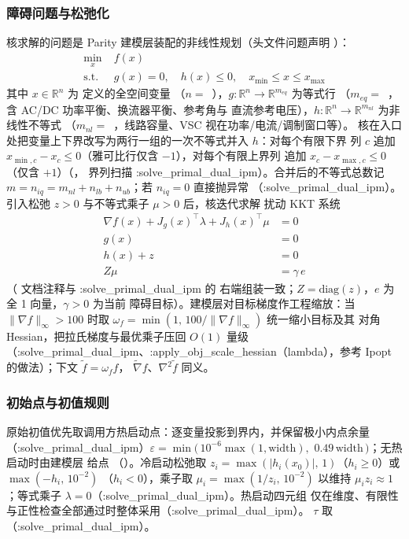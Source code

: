 \subsubsection*{障碍问题与松弛化}
核求解的问题是 Parity 建模层装配的非线性规划（头文件问题声明
）：
\begin{align*}
\min_{x}\; & f(x)\\
\text{s.t.}\; & g(x) = 0,\quad h(x) \le 0,\quad x_{\min} \le x \le x_{\max}
\end{align*}
其中 $x\in\mathbb{R}^{n}$ 为  定义的全空间变量
（$n=$~），$g:\mathbb{R}^n\to\mathbb{R}^{m_{eq}}$ 为等式行
（$m_{eq}=$~，含 AC/DC 功率平衡、换流器平衡、参考角与
直流参考电压），$h:\mathbb{R}^n\to\mathbb{R}^{m_{nl}}$ 为非线性不等式
（$m_{nl}=$~，线路容量、VSC 视在功率/电流/调制窗口等）。
核在入口处把变量上下界改写为两行一组的一次不等式并入 $h$：对每个有限下界
列 $c$ 追加 $x_{\min,c}-x_c\le 0$（雅可比行仅含 $-1$），对每个有限上界列
追加 $x_c-x_{\max,c}\le 0$（仅含 $+1$）（，
界列扫描 :solve\_primal\_dual\_ipm）。合并后的不等式总数记
$m=n_{iq}=m_{nl}+n_{lb}+n_{ub}$；若 $n_{iq}=0$ 直接抛异常
（:solve\_primal\_dual\_ipm）。引入松弛 $z>0$ 与不等式乘子 $\mu>0$ 后，核迭代求解
扰动 KKT 系统
\begin{align*}
\nabla f(x) + J_g(x)^{\top}\lambda + J_h(x)^{\top}\mu &= 0\\
g(x) &= 0\\
h(x) + z &= 0\\
Z\mu &= \gamma\, e
\end{align*}
（ 文档注释与 :solve\_primal\_dual\_ipm 的
右端组装一致；$Z=\mathrm{diag}(z)$，$e$ 为全 1 向量，$\gamma>0$ 为当前
障碍目标）。建模层对目标梯度作工程缩放：当
$\lVert\nabla f\rVert_\infty>100$ 时取
$\omega_f=\min(1,\,100/\lVert\nabla f\rVert_\infty)$ 统一缩小目标及其
对角 Hessian，把拉氏梯度与最优乘子压回 $O(1)$ 量级（:solve\_primal\_dual\_ipm、:apply\_obj\_scale\_hessian（lambda），参考
Ipopt  的做法）；下文 $\tilde f=\omega_f f$，
$\tilde\nabla f$、$\nabla^2\tilde f$ 同义。

\subsubsection*{初始点与初值规则}
原始初值优先取调用方热启动点：逐变量投影到界内，并保留极小内点余量
（:solve\_primal\_dual\_ipm）$\varepsilon=\min(\,10^{-6}\max(1,\mathrm{width}),$
$0.49\,\mathrm{width}\,)$；无热启动时由建模层 
给点
（）。冷启动松弛取
$z_i=\max(|h_i(x_0)|,\,1)$（$h_i\ge0$）或 $\max(-h_i,\,10^{-2})$
（$h_i<0$），乘子取 $\mu_i=\max(1/z_i,\,10^{-2})$ 以维持
$\mu_i z_i\approx1$；等式乘子 $\lambda=0$（:solve\_primal\_dual\_ipm）。热启动四元组
仅在维度、有限性与正性检查全部通过时整体采用（:solve\_primal\_dual\_ipm）。
$\tau$ 取 （:solve\_primal\_dual\_ipm）。

